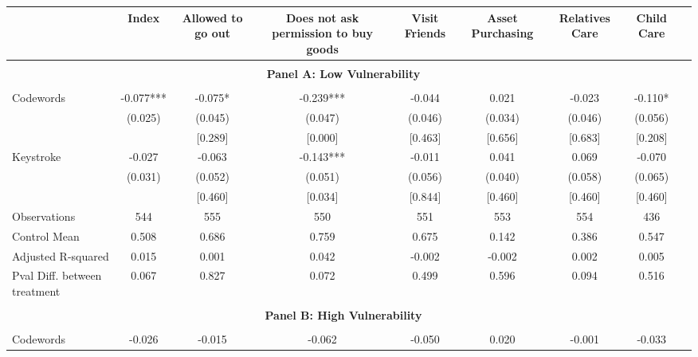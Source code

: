 \begin{tabular}{l*{8}{c}} \hline\hline
                    &\multicolumn{1}{c}{Index}&\multicolumn{1}{c}{Allowed to go out}&\multicolumn{1}{c}{Does not ask permission to buy goods}&\multicolumn{1}{c}{Visit Friends}&\multicolumn{1}{c}{Asset Purchasing}&\multicolumn{1}{c}{Relatives Care}&\multicolumn{1}{c}{Child Care}\\
\hline \\ \multicolumn{8}{c}{\textbf{Panel A: Low Vulnerability}} \\\\[-1ex]
Codewords           &      -0.077***&      -0.075*  &      -0.239***&      -0.044   &       0.021   &      -0.023   &      -0.110*  \\
                    &     (0.025)   &     (0.045)   &     (0.047)   &     (0.046)   &     (0.034)   &     (0.046)   &     (0.056)   \\
                    &               &     [0.289]   &     [0.000]   &     [0.463]   &     [0.656]   &     [0.683]   &     [0.208]   \\
Keystroke           &      -0.027   &      -0.063   &      -0.143***&      -0.011   &       0.041   &       0.069   &      -0.070   \\
                    &     (0.031)   &     (0.052)   &     (0.051)   &     (0.056)   &     (0.040)   &     (0.058)   &     (0.065)   \\
                    &               &     [0.460]   &     [0.034]   &     [0.844]   &     [0.460]   &     [0.460]   &     [0.460]   \\
\hline
Observations        &         544   &         555   &         550   &         551   &         553   &         554   &         436   \\
Control Mean        &       0.508   &       0.686   &       0.759   &       0.675   &       0.142   &       0.386   &       0.547   \\
Adjusted R-squared  &       0.015   &       0.001   &       0.042   &      -0.002   &      -0.002   &       0.002   &       0.005   \\
Pval Diff. between treatment&       0.067   &       0.827   &       0.072   &       0.499   &       0.596   &       0.094   &       0.516   \\
\hline \\ \multicolumn{8}{c}{\textbf{Panel B: High Vulnerability}} \\\\[-1ex]
Codewords           &      -0.026   &      -0.015   &      -0.062   &      -0.050   &       0.020   &      -0.001   &      -0.033   \\

\end{tabular}
